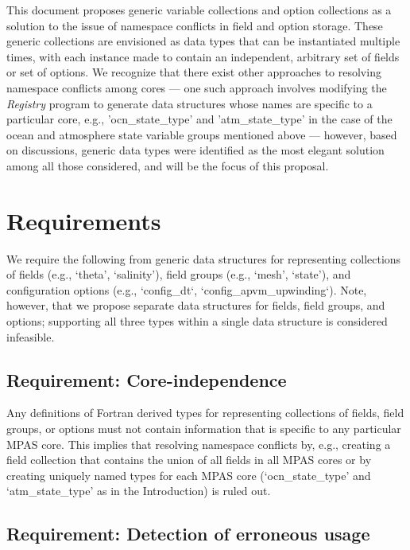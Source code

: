 \documentclass[11pt]{report}
\begin{document}
This document proposes generic variable collections and option collections as a solution to the issue of namespace conflicts in field and option storage. These generic collections are envisioned as data types that can be instantiated multiple times, with each instance made to contain an independent, arbitrary set of fields or set of options. We recognize that there exist other approaches to resolving namespace conflicts among cores --- one such approach involves modifying the {\em Registry} program to generate data structures whose names are specific to a particular core, e.g., 'ocn\_state\_type' and 'atm\_state\_type' in the case of the ocean and atmosphere state variable groups mentioned above --- however, based on discussions, generic data types were identified as the most elegant solution among all those considered, and will be the focus of this proposal.


%
%
\chapter{Requirements}
 
We require the following from generic data structures for representing collections of fields (e.g., `theta', `salinity'), field groups (e.g., `mesh', `state'), and configuration options (e.g., `config\_dt`, `config\_apvm\_upwinding`). Note, however, that we propose separate data structures for fields, field groups, and options; supporting all three types within a single data structure is considered infeasible.

\section{Requirement: Core-independence}

Any definitions of Fortran derived types for representing collections of fields, field groups, or options must not contain information that is specific to any particular MPAS core. This implies that resolving namespace conflicts by, e.g., creating a field collection that contains the union of all fields in all MPAS cores or by creating uniquely named types for each MPAS core (`ocn\_state\_type' and `atm\_state\_type' as in the Introduction) is ruled out. 

\section{Requirement: Detection of erroneous usage}
\end{document}
